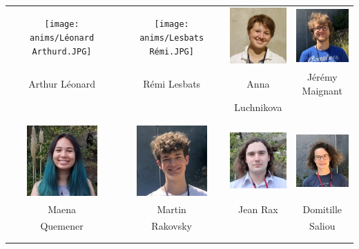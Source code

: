 \vfill
\vspace{2mm}
\begin{center}
\begin{tabular}{cccc}
\texttt{[image: anims/Léonard Arthurd.JPG]} &
\texttt{[image: anims/Lesbats Rémi.JPG]} &
\includegraphics[angle=0,origin=c, width=27mm]{anims/Luchnikova Anna.JPG} &
\includegraphics[angle=0,origin=c, width=27mm]{anims/Maignant Jérémy.JPG} \\
Arthur Léonard & Rémi Lesbats & Anna & Jérémy Maignant \\ & & Luchnikova & \\ \\ \\

\includegraphics[angle=0,origin=c, width=27mm]{anims/Quemener Maena.jpg} &
\includegraphics[angle=0,origin=c, width=27mm]{anims/Rakovsky Martin.JPG} &
\includegraphics[angle=0,origin=c, width=27mm]{anims/Rax Jean.jpg} &
\includegraphics[angle=0,origin=c, width=27mm]{anims/Saliou Domitille.JPG} \\
Maena & Martin & Jean Rax & Domitille \\ Quemener & Rakovsky & & Saliou \\ \\ \\


\end{tabular}
\end{center}
